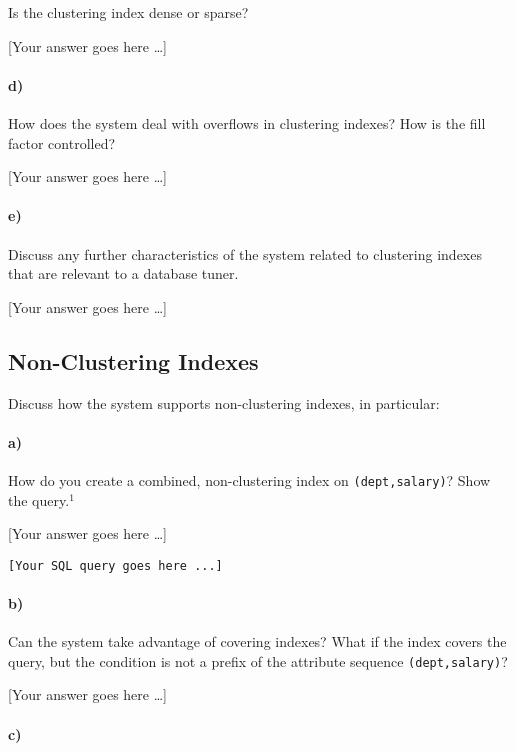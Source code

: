 \documentclass[11pt]{scrartcl}
\newcommand{\youranswerhere}{[Your answer goes here \ldots]}
\begin{document}
Is the clustering index dense or sparse?

\youranswerhere{}

\paragraph{d)}

How does the system deal with overflows in clustering indexes? How is the fill factor controlled?

\youranswerhere{}

\paragraph{e)}

Discuss any further characteristics of the system related to clustering indexes that are relevant to a database tuner.

\youranswerhere{}

\subsection{Non-Clustering Indexes}

Discuss how the system supports non-clustering indexes, in particular:

\paragraph{a)}

How do you create a combined, non-clustering index on \texttt{(dept,salary)}? Show the query.$^1$

\youranswerhere{}

\begin{lstlisting}[style=dbtsql]
[Your SQL query goes here ...]
\end{lstlisting}

\paragraph{b)}

Can the system take advantage of covering indexes? What if the index covers the query, but the condition is not a prefix of the attribute sequence \texttt{(dept,salary)}?

\youranswerhere{}

\paragraph{c)}
\end{document}

